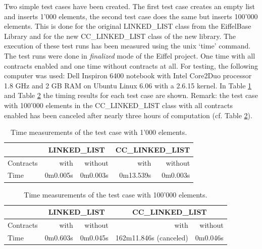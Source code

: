 Two simple test cases have been created. The first test case creates an empty list and inserts 1'000 elements, the second test case does the same but inserts 100'000 elements. This is done for the original LINKED\_LIST class from the EiffelBase Library and for the new CC\_LINKED\_LIST class of the new library. The execution of these test runs has been measured using the unix `time' command. The test runs were done in \emph{finalized} mode of the Eiffel project. One time with all contracts enabled and one time without contracts at all. For testing, the following computer was used: Dell Inspiron 6400 notebook with Intel Core2Duo processor 1.8 GHz and 2 GB RAM on Ubuntu Linux 6.06 with a 2.6.15 kernel. In Table \ref{tab:TimeMeasurements1} and Table \ref{tab:TimeMeasurements2} the timing results for each test case are shown. Remark: the test case with 100'000 elements in the CC\_LINKED\_LIST class with all contracts enabled has been canceled after nearly three hours of computation (cf. Table \ref{tab:TimeMeasurements2}).

\begin{table}
	\caption{Time measurements of the test case with 1'000 elements.}
	\centering
	\begin{tabular}{|l|rr|rr|}
		\hline
		& \multicolumn{2}{c}{LINKED\_LIST} \vline & \multicolumn{2}{c}{CC\_LINKED\_LIST} \vline \\
		\hline
		Contracts & with & without & with & without \\
		Time & 0m0.005s & 0m0.003s & 0m13.539s & 0m0.003s \\
		\hline
	\end{tabular}
	\label{tab:TimeMeasurements1}
\end{table}

\begin{table}
	\caption{Time measurements of the test case with 100'000 elements.}
	\centering
	\begin{tabular}{|l|rr|rr|}
		\hline
		& \multicolumn{2}{c}{LINKED\_LIST} \vline & \multicolumn{2}{c}{CC\_LINKED\_LIST} \vline \\
		\hline
		Contracts & with & without & with & without \\
		Time & 0m0.603s & 0m0.045s & 162m11.846s (canceled) & 0m0.046s \\
		\hline
	\end{tabular}
	\label{tab:TimeMeasurements2}
\end{table}

